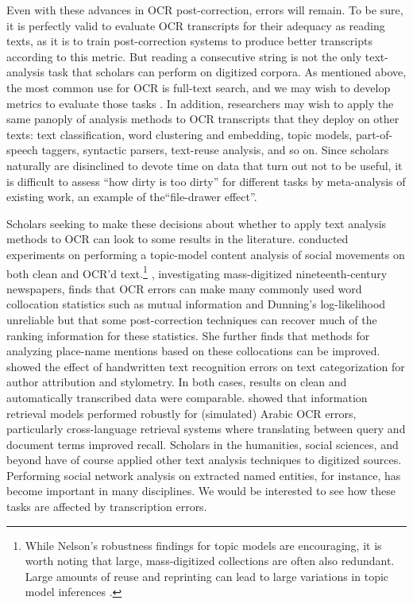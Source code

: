 \documentclass[twoside,11pt]{report}
\begin{document}
Even with these advances in OCR post-correction, errors will remain. To be sure, it is perfectly valid to evaluate OCR transcripts for their adequacy as reading texts, as it is to train post-correction systems to produce better transcripts according to this metric. But reading a consecutive string is not the only text-analysis task that scholars can perform on digitized corpora. As mentioned above, the most common use for OCR is full-text search, and we may wish to develop metrics to evaluate those tasks \citep{tanner09:_measur_mass_text_digit_qualit_useful}. In addition, researchers may wish to apply the same panoply of analysis methods to OCR transcripts that they deploy on other texts: text classification, word clustering and embedding, topic models, part-of-speech taggers, syntactic parsers, text-reuse analysis, and so on. Since scholars naturally are disinclined to devote time on data that turn out not to be useful, it is difficult to assess ``how dirty is too dirty'' for different tasks by meta-analysis of existing work, an example of the``file-drawer effect''.

Scholars seeking to make these decisions about whether to apply text analysis methods to OCR can look to some results in the literature. \cite{nelson17:_comput_groun_theor} conducted experiments on performing a topic-model content analysis of social movements on both clean and OCR'd text.\footnote{While Nelson's robustness findings for topic models are encouraging, it is worth noting that large, mass-digitized collections are often also redundant. Large amounts of reuse and reprinting can lead to large variations in topic model inferences \citep{schofield16:_compar_apple}.}  \cite{joulain-jay17:_corpus_linguis_histor}, investigating mass-digitized nineteenth-century newspapers, finds that OCR errors can make many commonly used word collocation statistics such as mutual information and Dunning's log-likelihood unreliable but that some post-correction techniques can recover much of the ranking information for these statistics.  She further finds that methods for analyzing place-name mentions based on these collocations can be improved.  \cite{franzini18:_attrib_author_noisy_digit_corres} showed the effect of handwritten text recognition errors on text categorization for author attribution and stylometry.  In both cases, results on clean and automatically transcribed data were comparable.  \cite{darwish02:_term_selec_searc_print_arabic} showed that information retrieval models performed robustly for (simulated) Arabic OCR errors, particularly cross-language retrieval systems where translating between query and document terms improved recall. Scholars in the humanities, social sciences, and beyond have of course applied other text analysis techniques to digitized sources. Performing social network analysis on extracted named entities, for instance, has become important in many disciplines. We would be interested to see how these tasks are affected by transcription errors.
\end{document}
